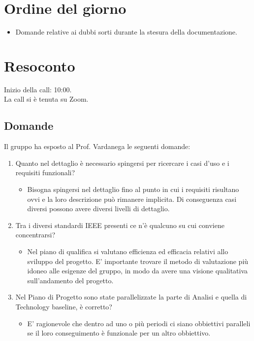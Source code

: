 \section{Ordine del giorno}

\begin{itemize}
	\item Domande relative ai dubbi sorti durante la stesura della documentazione.
\end{itemize}

\section{Resoconto}
\label{sec:Resoconto}

\noindent 
Inizio della call: 10:00. \\
\noindent La call si è tenuta su Zoom.

\subsection{Domande}
Il gruppo ha esposto al Prof. Vardanega le seguenti domande:

\begin{enumerate}
	\item Quanto nel dettaglio è necessario spingersi per ricercare i casi d'uso e i requisiti funzionali?
	\begin{itemize}
		\item Bisogna spingersi nel dettaglio fino al punto in cui i requisiti risultano ovvi e la loro descrizione può rimanere implicita.
			  Di conseguenza casi diversi possono avere diversi livelli di dettaglio.
	\end{itemize}
	\item Tra i diversi standardi IEEE presenti ce n'è qualcuno su cui conviene concentrarsi?
	\begin{itemize}
		\item Nel piano di qualifica si valutano efficienza ed efficacia relativi allo sviluppo del progetto. 
		E' importante trovare il metodo di valutazione più idoneo alle esigenze del gruppo, in modo da avere una visione qualitativa sull'andamento del progetto.
	\end{itemize}
	\item Nel Piano di Progetto sono state parallelizzate la parte di Analisi e quella di Technology baseline, è corretto?
	\begin{itemize}
		\item E' ragionevole che dentro ad uno o più periodi ci siano obbiettivi paralleli se il loro conseguimento è funzionale per un altro obbiettivo.
	\end{itemize}

	
\end{enumerate}


